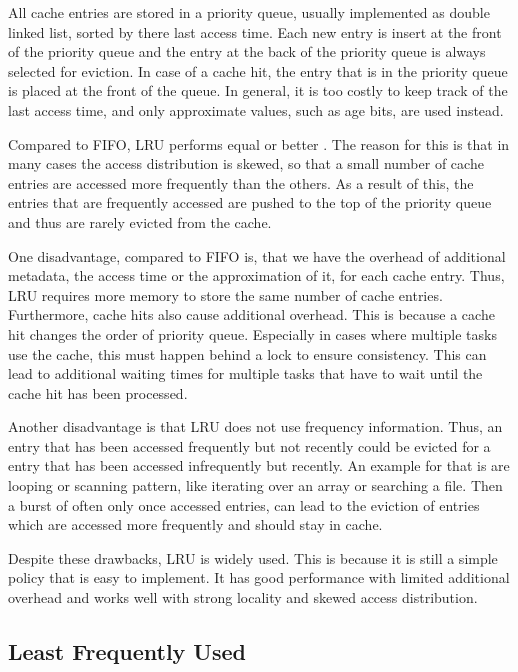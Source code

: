 \documentclass[
	12pt,
	a4paper,
	abstract,
	bibliography=totoc,
	chapterprefix,
	headings=openright,
	numbers=endperiod,
	parskip=half,
	twoside,
]{scrreprt}
\begin{document}
All cache entries are stored in a priority queue, usually implemented as double linked list, sorted by there last access time.
Each new entry is insert at the front of the priority queue and the entry at the back of the priority queue is always selected for eviction.
In case of a cache hit, the entry that is in the priority queue is placed at the front of the queue.
In general, it is too costly to keep track of the last access time, and only approximate values, such as age bits, are used instead.

Compared to FIFO, LRU performs equal or better \cite{van1992lru}.
The reason for this is that in many cases the access distribution is skewed, so that a small number of cache entries are accessed more frequently than the others.
As a result of this, the entries that are frequently accessed are pushed to the top of the priority queue and thus are rarely evicted from the cache.

One disadvantage, compared to FIFO is, that we have the overhead of additional metadata, the access time or the approximation of it, for each cache entry.
Thus, LRU requires more memory to store the same number of cache entries.
Furthermore, cache hits also cause additional overhead. 
This is because a cache hit changes the order of priority queue.
Especially in cases where multiple tasks use the cache, this must happen behind a lock to ensure consistency.
This can lead to additional waiting times for multiple tasks that have to wait until the cache hit has been processed.

Another disadvantage is that LRU does not use frequency information.
Thus, an entry that has been accessed frequently but not recently could be evicted for a entry that has been accessed infrequently but recently.
An example for that is are looping or scanning pattern, like iterating over an array or searching a file.
Then a burst of often only once accessed entries, can lead to the eviction of entries which are accessed more frequently and should stay in cache.

Despite these drawbacks, LRU is widely used.
This is because it is still a simple policy that is easy to implement.
It has good performance with limited additional overhead and works well with strong locality and skewed access distribution.

\subsection{Least Frequently Used}
\end{document}
